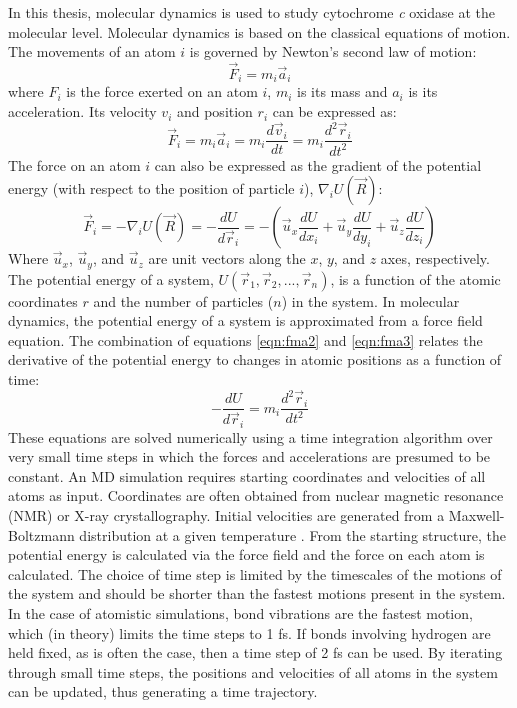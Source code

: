 In this thesis, molecular dynamics is used to study cytochrome \emph{c} oxidase at the molecular level. Molecular dynamics is based on the classical equations of motion. The movements of an atom $i$ is governed by Newton's second law of motion:
\begin{equation}
\label{eqn:fma}
\vec{F}_i = m_i\vec{a}_i
\end{equation}
where $F_i$ is the force exerted on an atom $i$, $m_i$ is its mass and $a_i$ is its acceleration. Its velocity $v_i$ and position $r_i$ can be expressed as:
\begin{equation}
\label{eqn:fma2}
\vec{F}_i = m_i\vec{a}_i = m_i\frac{d\vec{v}_i}{dt} = m_i\frac{d^2\vec{r}_i}{dt^2}
\end{equation}
The force on an atom $i$ can also be expressed as the gradient of the potential energy (with respect to the position of particle $i$), $\nabla_i U(\vec{R})$:
\begin{equation}
\label{eqn:fma3}
\vec{F}_i = -\nabla_i U(\vec{R}) = -\frac{dU}{d\vec{r}_i} = -(\vec{u}_x \frac{dU}{dx_i} + \vec{u}_y \frac{dU}{dy_i} + \vec{u}_z \frac{dU}{dz_i})
\end{equation}
Where $\vec{u}_x$, $\vec{u}_y$, and $\vec{u}_z$ are unit vectors along the $x$, $y$, and $z$ axes, respectively. The potential energy of a system, $U(\vec{r}_1, \vec{r}_2, ..., \vec{r}_n)$, is a function of the atomic coordinates $r$ and the number of particles ($n$) in the system. In molecular dynamics, the potential energy of a system is approximated from a force field equation. The combination of equations \ref{eqn:fma2} and \ref{eqn:fma3} relates the derivative of the potential energy to changes in atomic positions as a function of time:
\begin{equation}
\label{eqn:fma2potentialenergy}
-\frac{dU}{d\vec{r}_i} = m_i\frac{d^2 \vec{r}_i}{dt^2}
\end{equation}
These equations are solved numerically using a time integration algorithm over very small time steps in which the forces and accelerations are presumed to be constant. An MD simulation requires starting coordinates and velocities of all atoms as input. Coordinates are often obtained from nuclear magnetic resonance (NMR) or X-ray crystallography. Initial velocities are generated from a Maxwell-Boltzmann distribution at a given temperature \cite{Brooks:2009p6618}. From the starting structure, the potential energy is calculated via the force field and the force on each atom is calculated. The choice of time step is limited by the timescales of the motions of the system and should be shorter than the fastest motions present in the system. In the case of atomistic simulations, bond vibrations are the fastest motion, which (in theory) limits the time steps to 1 fs. If bonds involving hydrogen are held fixed, as is often the case, then a time step of 2 fs can be used. By iterating through small time steps, the positions and velocities of all atoms in the system can be updated, thus generating a time trajectory.


